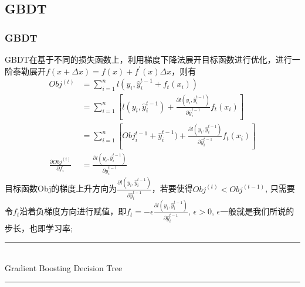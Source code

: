 \documentclass[a4paper]{article}
\begin{document}
	\subsection{GBDT}
		\subsubsection{GBDT}
			GBDT在基于不同的损失函数上，利用梯度下降法展开目标函数进行优化，进行一阶泰勒展开$f(x+\Delta x) = f(x) + f^{'}(x)\Delta x$，则有
				\begin{align*}
					Obj^{(t)} & = \sum_{i=1}^{n}l(y_i, \hat{y}_{i}^{t-1}+f_t(x_i)) \\
							  & = \sum_{i=1}^{n}[l(y_i, \hat{y}_{i}^{t-1})+\frac{\partial l(y_i, \hat{y}_{i}^{t-1})}{\partial \hat{y}_{i}^{t-1}}f_t(x_i)]\\
							  & = \sum_{i=1}^{n}[Obj_i^{t-1} + \hat{y}_{i}^{t-1})+\frac{\partial l(y_i, \hat{y}_{i}^{t-1})}{\partial \hat{y}_{i}^{t-1}}f_t(x_i)]\\
					\frac{\partial Obj^{(t)}}{\partial f_i} & =  \frac{\partial l(y_i, \hat{y}_{i}^{t-1})}{\partial \hat{y}_{i}^{t-1}} 
				\end{align*}
				目标函数Obj的梯度上升方向为$\frac{\partial l(y_i, \hat{y}_{i}^{t-1})}{\partial \hat{y}_{i}^{t-1}}$，若要使得$Obj^{(t)} < Obj^{(t-1)}$, 只需要令$f_t$沿着负梯度方向进行赋值，即$f_t = -\epsilon \frac{\partial l(y_i, \hat{y}_{i}^{t-1})}{\partial \hat{y}_{i}^{t-1}},\, \epsilon>0$,
				$\epsilon$一般就是我们所说的步长，也即学习率;\\
			\noindent\rule[0.10\baselineskip]{\textwidth}{0.75pt}\\
			Gradient Boosting Decision Tree\\
			\noindent\rule[0.10\baselineskip]{\textwidth}{0.5pt}
\end{document}
